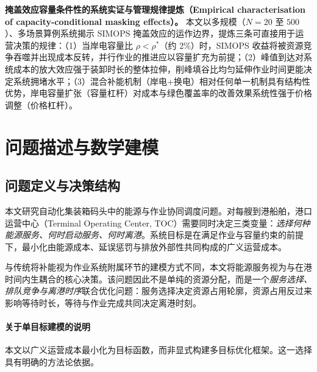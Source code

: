 \documentclass[UTF8, a4paper, 12pt]{ctexart}
\theoremstyle{plain}
\theoremstyle{definition}
\theoremstyle{remark}
\begin{document}
\textbf{掩盖效应容量条件性的系统实证与管理规律提炼（Empirical characterisation of capacity-conditional masking effects）。}
本文以多规模（$N = 20$ 至 $500$）、多场景算例系统揭示 SIMOPS 掩盖效应的运作边界，提炼三条可直接用于运营决策的规律：（1）当岸电容量比 $\rho < \rho^*$（约 2\%）时，SIMOPS 收益将被资源竞争吞噬并出现成本反转，并行作业的推进应以容量扩充为前提；（2）峰值到达对系统成本的放大效应强于装卸时长的整体拉伸，削峰填谷比均匀延伸作业时间更能决定系统拥堵水平；（3）混合补能机制（岸电+换电）相对任何单一机制具有结构性优势，岸电容量扩张（容量杠杆）对成本与绿色覆盖率的改善效果系统性强于价格调整（价格杠杆）。



\section{问题描述与数学建模}
\label{sec:model}

\subsection{问题定义与决策结构}
\label{sec:problem_definition_cn}

本文研究自动化集装箱码头中的能源与作业协同调度问题。对每艘到港船舶，港口运营中心（Terminal Operating Center, TOC）需要同时决定三类变量：\emph{选择何种能源服务、何时启动服务、何时离港}。系统目标是在满足作业与容量约束的前提下，最小化由能源成本、延误惩罚与排放外部性共同构成的广义运营成本。

与传统将补能视为作业系统附属环节的建模方式不同，本文将能源服务视为与在港时间内生耦合的核心决策。该问题因此不是单纯的资源分配，而是一个\emph{服务选择、排队竞争与离港时序}联合优化问题：服务选择决定资源占用轮廓，资源占用反过来影响等待时长，等待与作业完成共同决定离港时刻。

\paragraph{关于单目标建模的说明}
本文以广义运营成本最小化为目标函数，而非显式构建多目标优化框架。这一选择具有明确的方法论依据。
\end{document}
